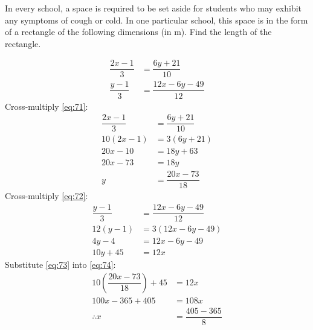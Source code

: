 \documentclass[11pt, answers, addpoints]{exam}
\renewcommand{\frac}[2]{\dfrac{#1}{#2}}
\begin{document}
\begin{questions}
	In every school, a space is required to be set aside for students who
	may exhibit any symptoms of cough or cold. In one particular school, this
	space is in the form of a rectangle of the following dimensions
	(in \si{\metre}). Find the length of the rectangle.
	\begin{figure}[htpb]
		\centering
		\label{fig:rect}
	\end{figure}
	\begin{solution}
		\begin{align}
			\frac{2x - 1}{3} & = \frac{6y + 21}{10}\label{eq:71}\tag{1}       \\
			\frac{y - 1}{3}  & = \frac{12x - 6y - 49}{12}\label{eq:72}\tag{2}
		\end{align}
		Cross-multiply \eqref{eq:71}:
		\begin{align*}
			\frac{2x - 1}{3} & = \frac{6y + 21}{10}                       \\
			10(2x - 1)       & = 3(6y + 21)                               \\
			20x - 10         & = 18y + 63                                 \\
			20x - 73         & = 18y                                      \\
			y                & = \dfrac{20x - 73}{18}\label{eq:73}\tag{3}
		\end{align*}
		Cross-multiply \eqref{eq:72}:
		\begin{align*}
			\frac{y - 1}{3} & = \frac{12x - 6y - 49}{12} \\
			12(y - 1)       & = 3(12x - 6y - 49)         \\
			4y - 4          & = 12x - 6y - 49            \\
			10y + 45        & = 12x \label{eq:74}\tag{4}
		\end{align*}
		Substitute \eqref{eq:73} into \eqref{eq:74}:
		\begin{align*}
			10\left(\frac{20x - 73}{18}\right) + 45 & = 12x                                  \\
			100x - 365 + 405                        & = 108x                                 \\
			\therefore x                            & = \frac{405 - 365}{8}                  \\

\end{align*}
\end{solution}
\end{questions}
\end{document}
